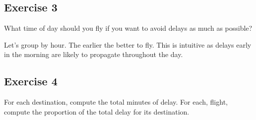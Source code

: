 \documentclass[]{book}
\newenvironment{Shaded}{\begin{snugshade}}{\end{snugshade}}
\newcommand{\CommentTok}[1]{\textcolor[rgb]{0.56,0.35,0.01}{\textit{#1}}}
\newcommand{\DataTypeTok}[1]{\textcolor[rgb]{0.13,0.29,0.53}{#1}}
\newcommand{\KeywordTok}[1]{\textcolor[rgb]{0.13,0.29,0.53}{\textbf{#1}}}
\newcommand{\NormalTok}[1]{#1}
\newcommand{\OperatorTok}[1]{\textcolor[rgb]{0.81,0.36,0.00}{\textbf{#1}}}
\newcommand{\OtherTok}[1]{\textcolor[rgb]{0.56,0.35,0.01}{#1}}
\newcommand{\StringTok}[1]{\textcolor[rgb]{0.31,0.60,0.02}{#1}}
\theoremstyle{definition}
\theoremstyle{definition}
\theoremstyle{definition}
\theoremstyle{remark}
\begin{document}
\hypertarget{exercise-3-6}{%
\subsection{Exercise 3}\label{exercise-3-6}}

What time of day should you fly if you want to avoid delays as much as
possible?

Let's group by hour. The earlier the better to fly. This is intuitive as
delays early in the morning are likely to propagate throughout the day.

\begin{Shaded}
\end{Shaded}

\hypertarget{exercise-4-5}{%
\subsection{Exercise 4}\label{exercise-4-5}}

For each destination, compute the total minutes of delay. For each,
flight, compute the proportion of the total delay for its destination.
\end{document}
